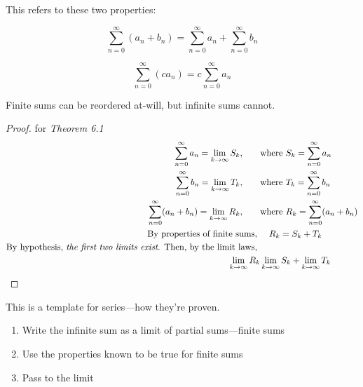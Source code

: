 \documentclass[../13.tex]{subfiles}
\begin{document}
This refers to these two properties:\\
\begin{minipage}{0.5\linewidth}
    \begin{equation*}
        {\sum_{n = 0}^{\infty} (a_n + b_n) = \sum_{n = 0}^{\infty} a_n + \sum_{n = 0}^{\infty} b_n}
    \end{equation*}
\end{minipage}
\begin{minipage}{0.5\linewidth}
    \begin{equation*}
        {\sum_{n = 0}^{\infty} (ca_n)= c \sum_{n = 0}^{\infty} a_n}
    \end{equation*}
\end{minipage}
Finite sums can be reordered at-will, but infinite sums cannot.


\begin{proof} for \emph{Theorem 6.1}
    \begin{align*}
        \sum_{n = 0}^{\infty} a_n = \lim_{k\to\infty} S_k, \qquad         & \text{where } S_k = \sum_{n = 0}^{\infty} a_n         \\
        \sum_{n = 0}^{\infty} b_n = \lim_{k\to\infty} T_k, \qquad         & \text{where } T_k = \sum_{n = 0}^{\infty} b_n         \\
        \sum_{n = 0}^{\infty} (a_n + b_n) = \lim_{k\to\infty} R_k, \qquad & \text{where } R_k = \sum_{n = 0}^{\infty} (a_n + b_n) \\
        \text{By properties of finite sums, }                             & \quad R_k = S_k + T_k                                 \\
        \text{By hypothesis, \emph{the first two limits exist}. Then, by the limit laws, }                                        \\
        \lim_{k\to\infty} R_k                                             & \lim_{k\to\infty} S_k + \lim_{k\to\infty} T_k
    \end{align*}
\end{proof}

This is a template for series---how they're proven. \begin{enumerate}
    \item Write the infinite sum as a limit of partial sums---finite sums
    \item Use the properties known to be true for finite sums
    \item Pass to the limit
\end{enumerate}

\newpage
\end{document}
